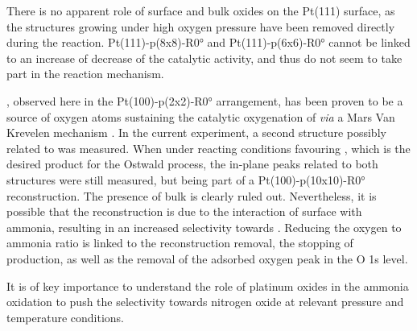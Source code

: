 There is no apparent role of surface and bulk oxides on the Pt(111) surface, as the structures growing under high oxygen pressure have been removed directly during the reaction.
Pt(111)-p(8x8)-R\ang{0} and Pt(111)-p(6x6)-R\ang{0} cannot be linked to an increase of decrease of the catalytic activity, and thus do not seem to take part in the reaction mechanism.

, observed here in the Pt(100)-p(2x2)-R\ang{0} arrangement, has been proven to be a source of oxygen atoms sustaining the catalytic oxygenation of  \textit{via} a Mars Van Krevelen mechanism \parencite{Seriani2006, Seriani2008}.
In the current experiment, a second structure possibly related to  was measured.
When under reacting conditions favouring , which is the desired product for the Ostwald process, the in-plane peaks related to both structures were still measured, but being part of a Pt(100)-p(10x10)-R\ang{0} reconstruction.
The presence of bulk  is clearly ruled out.
Nevertheless, it is possible that the reconstruction is due to the interaction of surface  with ammonia, resulting in an increased selectivity towards .
Reducing the oxygen to ammonia ratio is linked to the reconstruction removal, the stopping of  production, as well as the removal of the adsorbed oxygen peak in the O 1s level.

It is of key importance to understand the role of platinum oxides in the ammonia oxidation to push the selectivity towards nitrogen oxide at relevant pressure and temperature conditions.